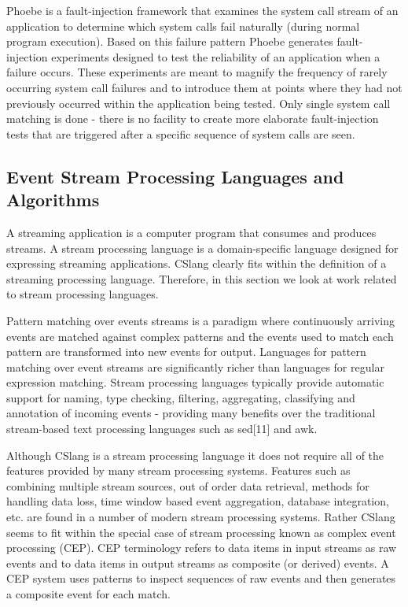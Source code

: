 Phoebe\cite{DBLP:journals/corr/abs-2006-04444} is a fault-injection framework that examines
the system call stream of an application to determine which system calls fail
naturally (during normal program execution). Based on this failure pattern
Phoebe generates fault-injection experiments designed to test the reliability of
an application when a failure occurs. These experiments are meant to magnify the
frequency of rarely occurring system call failures and to introduce them at
points where they had not previously occurred within the application being
tested. Only single system call matching is done - there is no facility to create
more elaborate fault-injection tests that are triggered after a specific
sequence of system calls are seen.

\subsection{Event Stream Processing Languages and Algorithms}

A streaming application is a computer program that consumes and
produces streams. A stream processing language is a domain-specific language
designed for expressing streaming applications\cite{DBLP:journals/sigmod/HirzelBBVSV18}. CSlang clearly
fits within the definition of a streaming processing language. Therefore, in this
section we look at work related to stream processing languages.

Pattern matching
over events streams is a paradigm where continuously arriving events are matched
against complex patterns and the events used to match each pattern are
transformed into new events for output. Languages for pattern matching over event
streams are significantly richer than languages for regular expression
matching\cite{DBLP:conf/sigmod/AgrawalDGI08}. Stream processing languages typically provide automatic
support for naming, type checking, filtering, aggregating, classifying and
annotation of incoming events - providing many benefits over the traditional
stream-based text processing languages such as sed[11] and
awk\cite{DBLP:journals/spe/AhoKW79}.

Although CSlang is a stream processing language it does not
require all of the features provided by many stream processing systems. Features
such as combining multiple stream sources, out of order data retrieval, methods
for handling data loss, time window based event aggregation, database
integration, etc. are found in a number of modern stream processing
systems\cite{DBLP:journals/csur/DayarathnaP18}.   Rather CSlang seems to fit within the special case of
stream processing known as complex event processing (CEP). CEP terminology refers
to data items in input streams as raw events and to data items in output streams
as composite (or derived) events. A CEP system uses patterns to inspect
sequences of raw events and then generates a composite event for each
match\cite{DBLP:journals/ibmrd/HirzelAGJKKMNSSW13}.

